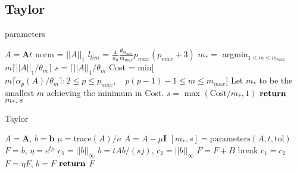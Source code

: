 \FloatBarrier

\subsection{Taylor}
\begin{algorithm}
	\caption{parameters} 
	\begin{algorithmic}[1]
		\State $A = \boldsymbol{A}t$
		\State norm = $||A||_{1}$
        \State $l_{lim}$ = $\frac{4}{n_{0}}\frac{\theta_{m_{max}}}{m_{max}}p_{max}(p_{max}+3)$
            \State $m_{*} = $ argmin$_{1 \leq m \leq m_{max}}$ $m\lceil ||A||_{1}/\theta_{m}\rceil$
            \State $s = \lceil ||A||_{1}/\theta_{m}$
        \Else
            \State Cost = min[$m\lceil \alpha_{p}(A)/\theta_{m}\rceil : 2 \leq p \leq p_{max},\quad p(p-1) -1 \leq m \leq m_{max}$]
            \State Let $m_{*}$ to be the smallest $m$ achieving the minimum in Cost.
            \State$s = $ max $(\text{Cost}/m_{*}, 1)$
        \EndIf
        \State ${\text{\textbf{return}}}$ $m_{*}, s$  
		\EndProcedure
	\end{algorithmic} 
	\label{alg:taylor_parameters}
\end{algorithm}

\begin{algorithm}
	\caption{Taylor} 
	\begin{algorithmic}[1]
		\State $A = \boldsymbol{A}$, $b = \boldsymbol{b}$
        \State $\mu = \text{trace}(A)/n$
        \State $A = A - \mu \boldsymbol{I}$
        \State $[m_{*}, s] = \text{parameters}(A, t, \text{tol})$
        \State $F = b$, $\eta = e^{t\mu}$
            \State $c_{1} = ||b||_{\infty}$
                \State $b = tAb/(sj)$, $c_{2} = ||b||_{\infty}$
                \State $ F = F + B$
                    \State break
                \EndIf
                \State $c_{1} = c_{2}$
            \EndFor
            \State $F = \eta F$, $b = F$
        \EndFor
        \State ${\text{\textbf{return}}}$ $F$  
		\EndProcedure
	\end{algorithmic} 
	\label{alg:taylor}
\end{algorithm}